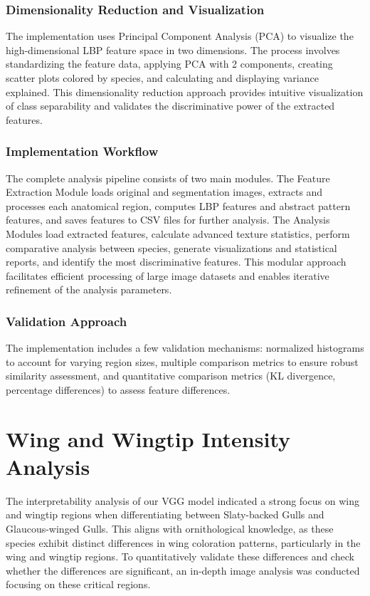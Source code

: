 \documentclass[a4paper,12pt]{report}
\begin{document}
\subsubsection{Dimensionality Reduction and Visualization}
The implementation uses Principal Component Analysis (PCA) to visualize the high-dimensional LBP feature space in two dimensions. The process involves standardizing the feature data, applying PCA with 2 components, creating scatter plots colored by species, and calculating and displaying variance explained. This dimensionality reduction approach provides intuitive visualization of class separability and validates the discriminative power of the extracted features.

\subsubsection{Implementation Workflow}
The complete analysis pipeline consists of two main modules. The Feature Extraction Module loads original and segmentation images, extracts and processes each anatomical region, computes LBP features and abstract pattern features, and saves features to CSV files for further analysis. The Analysis Modules load extracted features, calculate advanced texture statistics, perform comparative analysis between species, generate visualizations and statistical reports, and identify the most discriminative features. This modular approach facilitates efficient processing of large image datasets and enables iterative refinement of the analysis parameters.

\subsubsection{Validation Approach}
The implementation includes a few validation mechanisms: normalized histograms to account for varying region sizes, multiple comparison metrics to ensure robust similarity assessment, and quantitative comparison metrics (KL divergence, percentage differences) to assess feature differences.

\section{Wing and Wingtip Intensity Analysis}
The interpretability analysis of our VGG model indicated a strong focus on wing and wingtip regions when differentiating between Slaty-backed Gulls and Glaucous-winged Gulls. This aligns with ornithological knowledge, as these species exhibit distinct differences in wing coloration patterns, particularly in the wing and wingtip regions. To quantitatively validate these differences and check whether the differences are significant, an in-depth image analysis was conducted focusing on these critical regions.
\end{document}

